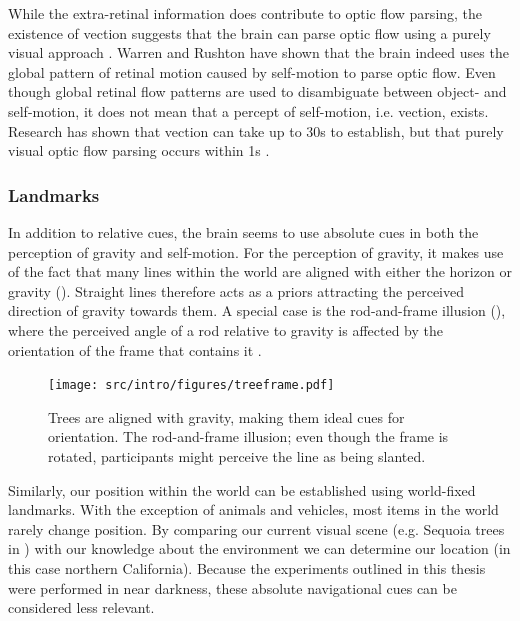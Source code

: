 While the extra-retinal information does contribute to optic flow parsing, the existence of vection \cite{dichgans1978} suggests that the brain can parse optic flow using a purely visual approach \cite{rushton2005,warren2007}. Warren and Rushton \citeyear{warren2009} have shown that the brain indeed uses the global pattern of retinal motion caused by self-motion to parse optic flow. Even though global retinal flow patterns are used to disambiguate between object- and self-motion, it does not mean that a percept of self-motion, i.e. vection, exists. Research has shown that vection can take up to 30s to establish, but that purely visual optic flow parsing occurs within 1s \cite{warren2009}.

\subsubsection{Landmarks}
In addition to relative cues, the brain seems to use absolute cues in both the perception of gravity and self-motion. For the perception of gravity, it makes use of the fact that many lines within the world are aligned with either the horizon or gravity (). Straight lines therefore acts as a priors attracting the perceived direction of gravity towards them. A special case is the rod-and-frame illusion (), where the perceived angle of a rod relative to gravity is affected by the orientation of the frame that contains it \cite{witkin1948}. 

\begin{figure}
	\texttt{[image: src/intro/figures/treeframe.pdf]}
	\caption{ Trees are aligned with gravity, making them ideal cues for orientation.  The rod-and-frame illusion; even though the frame is rotated, participants might perceive the line as being slanted.}
	\label{intro:fig:treeframe}
\end{figure}

Similarly, our position within the world can be established using world-fixed landmarks. With the exception of animals and vehicles, most items in the world rarely change position. By comparing our current visual scene (e.g. Sequoia trees in ) with our knowledge about the environment we can determine our location (in this case northern California). Because the experiments outlined in this thesis were performed in near darkness, these absolute navigational cues can be considered less relevant. 



